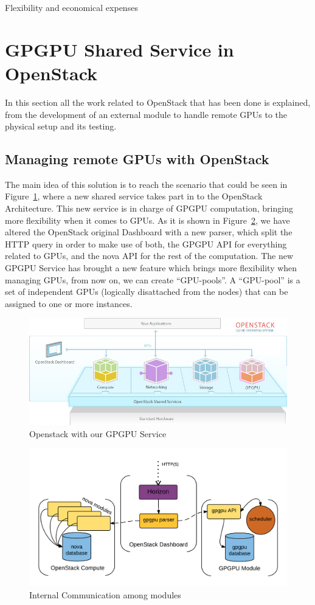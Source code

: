 \documentclass[a4paper,twoside]{article}
\begin{document}
Flexibility and economical expenses

\section{GPGPU Shared Service in OpenStack}
In this section all the work related to OpenStack that has been done is explained, from the development of an external module to handle remote GPUs to the physical setup and its testing.
\subsection{Managing remote GPUs with OpenStack}
The main idea of this solution is to reach the scenario that could be seen in Figure~\ref{fig:external}, where a new shared service takes part in to the OpenStack Architecture.
This new service is in charge of GPGPU computation, bringing more flexibility when it comes to GPUs.
As it is shown in Figure~\ref{fig:internal}, we have altered the OpenStack original Dashboard with a new parser, 
which split the HTTP query in order to make use of both, the GPGPU API for everything related to GPUs, and the nova API for the rest of the computation. 
The new GPGPU Service has brought a new feature which brings more flexibility when managing GPUs, from now on, we can create ``GPU-pools''. 
A ``GPU-pool'' is a set of independent GPUs (logically disattached from the nodes) that can be assigned to one or more instances.


\begin{figure}[htb]
  \centering
  \includegraphics[width=\linewidth]{images/os1.jpg}
  \caption{Openstack with our GPGPU Service}
  \label{fig:external}
\end{figure}

\begin{figure}[htb]
  \centering
  \includegraphics[width=\linewidth]{images/os2.png}
  \caption{Internal Communication among modules}
  \label{fig:internal}
\end{figure}
\end{document}
